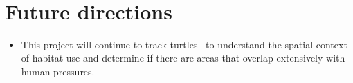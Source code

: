\documentclass[version=last,
    paper=a4, %
    10pt, %
    usenames,
    dvipsnames,
    oneside, %
    headings=openany, %
    DIV=15 %
]{scrbook}
\begin{document}
~



\section*{Future directions}
\begin{itemize}
\itemsep1pt\parskip0pt
\item
  This project will continue to track turtles ~to understand the spatial
  context of habitat use and determine if there are areas that overlap
  extensively with human pressures.~
\end{itemize}



\end{document}
